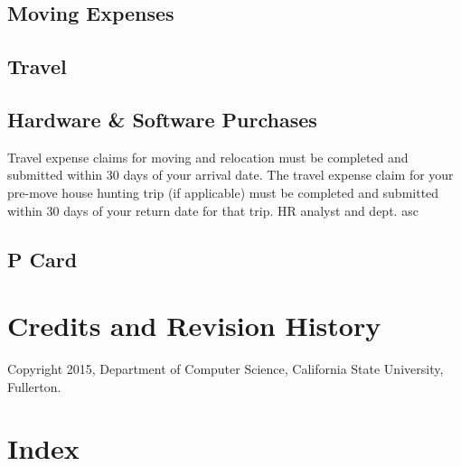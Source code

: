 \documentclass{book}
\begin{document}
\section{Moving Expenses}
\section{Travel}
\section{Hardware \& Software Purchases}
Travel expense claims for moving and relocation must be completed and submitted within 30 days of your arrival date.  The travel expense claim for your pre-move house hunting trip (if applicable) must be completed and submitted within 30 days of your return date for that trip.
HR analyst and dept. asc

\section{P Card}




\chapter{Credits and Revision History}

Copyright 2015, Department of Computer Science, California State University, Fullerton.

\chapter{Index}
\printindex
\end{document}
